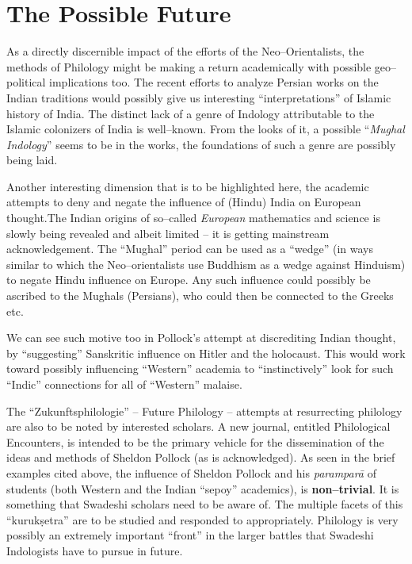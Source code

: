 \section*{The Possible Future}

As a directly discernible impact of the efforts of the Neo–Orientalists, the methods of Philology might be making a return academically with possible geo–political implications too. The recent efforts to analyze Persian works on the Indian traditions would possibly give us interesting “interpretations” of Islamic history of India. The distinct lack of a genre of Indology attributable to the Islamic colonizers of India is well–known. From the looks of it, a possible “\textit{Mughal Indology}” seems to be in the works, the foundations of such a genre are possibly being laid.

Another interesting dimension that is to be highlighted here, the academic attempts to deny and negate the influence of (Hindu) India on European thought.The Indian origins of so–called \textit{European} mathematics and science is slowly being revealed and albeit limited – it is getting mainstream acknowledgement. The “Mughal” period can be used as a “wedge” (in ways similar to which the Neo–orientalists use Buddhism as a wedge against Hinduism) to negate Hindu influence on Europe. Any such influence could possibly be ascribed to the Mughals (Persians), who could then be connected to the Greeks etc.

We can see such motive too in Pollock’s attempt at discrediting Indian thought, by “suggesting” Sanskritic influence on Hitler and the holocaust. This would work toward possibly influencing “Western” academia to “instinctively” look for such “Indic” connections for all of “Western” malaise.

The “Zukunftsphilologie” – Future Philology – attempts at resurrecting philology are also to be noted by interested scholars. A new journal, entitled Philological Encounters, is intended to be the primary vehicle for the dissemination of the ideas and methods of Sheldon Pollock (as is acknowledged). As seen in the brief examples cited above, the influence of Sheldon Pollock and his \textit{paramparā} of students (both Western and the Indian “sepoy” academics), is \textbf{non–trivial}. It is something that Swadeshi scholars need to be aware of. The multiple facets of this “kurukṣetra” are to be studied and responded to appropriately. Philology is very possibly an extremely important “front” in the larger battles that Swadeshi Indologists have to pursue in future.


